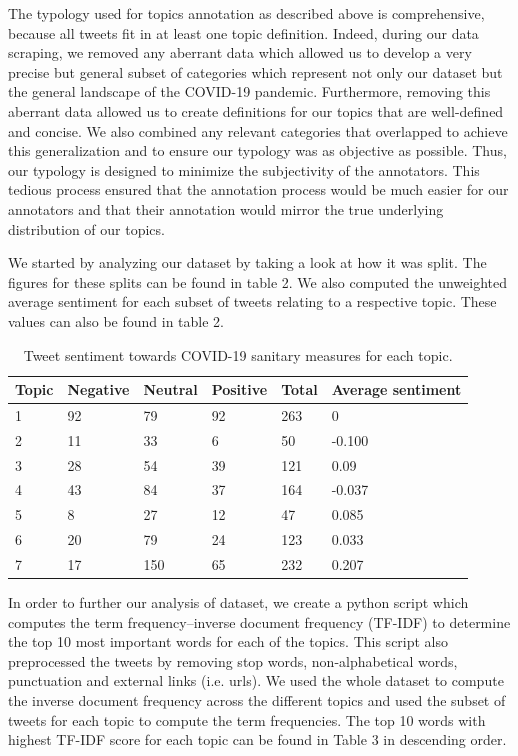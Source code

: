\documentclass[letterpaper]{article} %
\begin{document}

The typology used for topics annotation as described above is comprehensive, because all tweets fit in at least one topic definition. Indeed, during our data scraping, we removed any aberrant data which allowed us to develop a very precise but general subset of categories which represent not only our dataset but the general landscape of the COVID-19 pandemic. Furthermore, removing this aberrant data allowed us to create definitions for our topics that are well-defined and concise. We also combined any relevant categories that overlapped to achieve this generalization and to ensure our typology was as objective as possible. Thus, our typology is designed to minimize the subjectivity of the annotators. This tedious process ensured that the annotation process would be much easier for our annotators and that their annotation would mirror the true underlying distribution of our topics.

We started by analyzing our dataset by taking a look at how it was split. The figures for these splits can be found in table 2. We also computed the unweighted average sentiment for each subset of tweets relating to a respective topic. These values can also be found in table 2.

\begin{table}[htb]
    \caption{Tweet sentiment towards COVID-19 sanitary measures for each topic.}
  \centering
\begin{tabular}{ |M{0.7cm}||M{1.2cm}|M{1cm}|M{1.1cm}|M{0.7cm}|M{1.4cm}| }
 \hline
 Topic & Negative & Neutral & Positive & Total & Average sentiment \\
  & 92 & 79 & 92 & 263 & 0\\
2 & 11 & 33 & 6 & 50 & -0.100\\
3 & 28 & 54 & 39 & 121 & 0.09\\
4 & 43 & 84 & 37 & 164 & -0.037\\
5 & 8 & 27 & 12 & 47 & 0.085\\
6 & 20 & 79 & 24 & 123 & 0.033\\
7 & 17 & 150 & 65 & 232 & 0.207\\
 \hline
\end{tabular}
\end{table}

In order to further our analysis of dataset, we create a python script which computes the term frequency–inverse document frequency (TF-IDF) to determine the top 10 most important words for each of the topics. This script also preprocessed the tweets by removing stop words, non-alphabetical words, punctuation and external links (i.e. urls). We used the whole dataset to compute the inverse document frequency across the different topics and used the subset of tweets for each topic to compute the term frequencies. The top 10 words with highest TF-IDF score for each topic can be found in Table 3 in descending order. 
\end{document}

